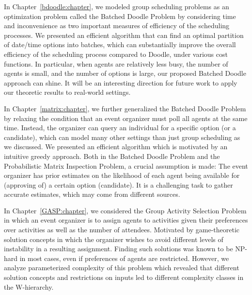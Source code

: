 \label{discussion:chapter}

In Chapter~\ref{bdoodle:chapter}, we modeled group scheduling problems as an optimization problem called the Batched Doodle Problem by considering time and inconvenience as two important measures of efficiency of the scheduling processes. We presented an efficient algorithm that can find an optimal partition of date/time options into batches, which can substantially improve the overall efficiency of the scheduling process compared to Doodle, under various cost functions. In particular, when agents are relatively less busy, the number of agents is small, and the number of options is large, our proposed Batched Doodle approach can shine. It will be an interesting direction for future work to apply our theoretic results to real-world settings.

In Chapter~\ref{matrix:chapter}, we further generalized the Batched Doodle Problem by relaxing the condition that an event organizer must poll all agents at the same time. Instead, the organizer can query an individual for a specific option (or a candidate), which can model many other settings than just group scheduling as we discussed. We presented an efficient algorithm which is motivated by an intuitive greedy approach. Both in the Batched Doodle Problem and the Probabilistic Matrix Inspection Problem, a crucial assumption is made: The event organizer has prior estimates on the likelihood of each agent being available for (approving of) a certain option (candidate). It is a challenging task to gather accurate estimates, which may come from different sources. 

In Chapter~\ref{GASP:chapter}, we considered the Group Activity Selection Problem in which an event organizer is to assign agents to activities given their preferences over activities as well as the number of attendees. Motivated by game-theoretic solution concepts in which the organizer wishes to avoid different levels of instability in a resulting assignment. Finding such solutions was known to be NP-hard in most cases, even if preferences of agents are restricted. However, we analyze parameterized complexity of this problem which revealed that different solution concepts and restrictions on inputs led to different complexity classes in the W-hierarchy. 

